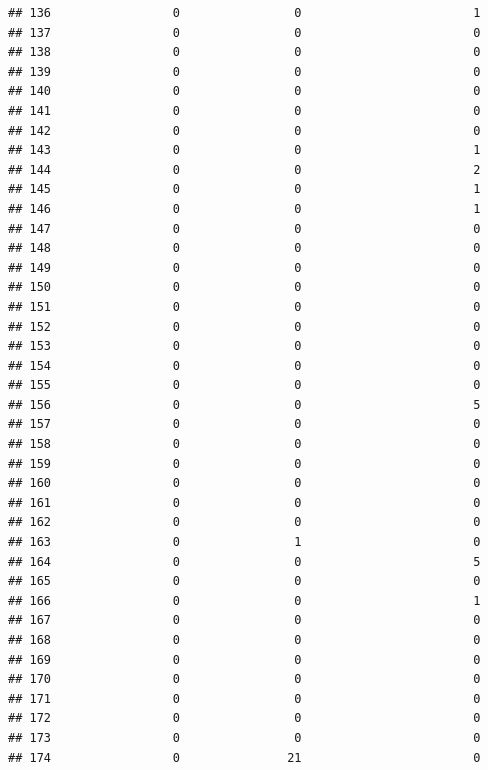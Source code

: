 \documentclass[
]{article}
\begin{document}
\begin{verbatim}
## 136                 0                0                        1
## 137                 0                0                        0
## 138                 0                0                        0
## 139                 0                0                        0
## 140                 0                0                        0
## 141                 0                0                        0
## 142                 0                0                        0
## 143                 0                0                        1
## 144                 0                0                        2
## 145                 0                0                        1
## 146                 0                0                        1
## 147                 0                0                        0
## 148                 0                0                        0
## 149                 0                0                        0
## 150                 0                0                        0
## 151                 0                0                        0
## 152                 0                0                        0
## 153                 0                0                        0
## 154                 0                0                        0
## 155                 0                0                        0
## 156                 0                0                        5
## 157                 0                0                        0
## 158                 0                0                        0
## 159                 0                0                        0
## 160                 0                0                        0
## 161                 0                0                        0
## 162                 0                0                        0
## 163                 0                1                        0
## 164                 0                0                        5
## 165                 0                0                        0
## 166                 0                0                        1
## 167                 0                0                        0
## 168                 0                0                        0
## 169                 0                0                        0
## 170                 0                0                        0
## 171                 0                0                        0
## 172                 0                0                        0
## 173                 0                0                        0
## 174                 0               21                        0

\end{verbatim}
\end{document}
